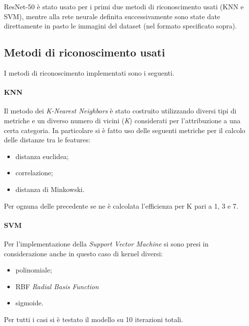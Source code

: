 \documentclass[11pt, a4paper, titlepage]{article}
\begin{document}
ResNet-50 è stato usato per i primi due metodi di riconoscimento usati (KNN e SVM), mentre alla rete neurale definita successivamente sono state date direttamente in pasto le immagini del dataset (nel formato specificato sopra).
 
\subsection{Metodi di riconoscimento usati}
I metodi di riconoscimento implementati sono i seguenti. 

\paragraph{KNN}
Il metodo dei \emph{K-Nearest Neighbors} è stato costruito utilizzando diversi tipi di metriche e un diverso numero di vicini (\emph{K}) considerati per l'attribuzione a una certa categoria. In particolare si è fatto uso delle seguenti metriche per il calcolo delle distanze tra le features:
\begin{itemize}
    \item distanza euclidea;
    \item correlazione;
    \item distanza di Minkowski.
\end{itemize}
Per ognuna delle precedente se ne è calcolata l'efficienza per K pari a 1, 3 e 7.

\paragraph{SVM}
Per l'implementazione della \emph{Support Vector Machine} si sono presi in considerazione anche in questo caso di kernel diversi:
\begin{itemize}
    \item polinomiale;
    \item RBF \emph{Radial Basis Function}
    \item sigmoide.
\end{itemize}
Per tutti i casi si è testato il modello su 10 iterazioni totali. 
\end{document}
